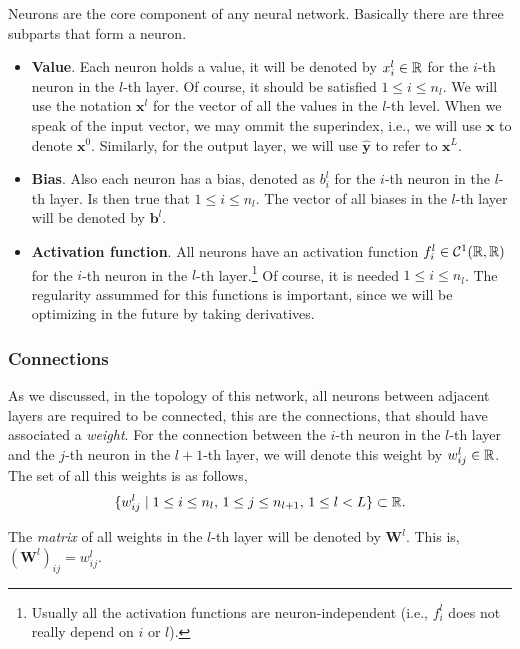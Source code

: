 Neurons are the core component of any neural network. Basically there are three
subparts that form a neuron.
\begin{itemize}
  \item \textbf{Value}. Each neuron holds a value, it will be denoted by
  \(x_i^l \in \mathbb{R}\) for the \(i\)-th neuron in the \(l\)-th layer. Of course, it
  should be satisfied \(1 \leq i \leq n_l\). We will use the notation
  \(\mathbf{x}^l\) for the vector of all the values in the \(l\)-th level. When
  we speak of the input vector, we may ommit the superindex, i.e., we will use
  \(\mathbf{x}\) to denote \(\mathbf{x}^0\). Similarly, for the output layer,
  we will use \(\mathbf{\hat{y}}\) to refer to \(\mathbf{x}^L\).
  \item \textbf{Bias}. Also each neuron has a bias, denoted as \(b_i^l\) for
  the \(i\)-th neuron in the \(l\)-th layer. Is then true that
  \(1 \leq i \leq n_l\). The vector of all biases in the \(l\)-th layer will be
  denoted by \(\mathbf{b}^l\).
  \item \textbf{Activation function}. All neurons have an activation function
  \(f_i ^ l \in \mathcal{C} ^ 1 (\mathbb{R}, \mathbb{R})\) for the \(i\)-th neuron in the
  \(l\)-th layer.\footnote{Usually all the activation functions are
    neuron-independent (i.e., \(f_i^l\) does not really depend on \(i\) or
    \(l\)).} Of course, it is needed \(1 \leq i \leq n_l\). The regularity
  assummed for this functions is important, since we will be optimizing in the
  future by taking derivatives.
\end{itemize}

\subsubsection{Connections}

As we discussed, in the topology of this network, all neurons between adjacent
layers are required to be connected, this are the connections, that should have
associated a \emph{weight}. For the connection between the \(i\)-th neuron in
the \(l\)-th layer and the \(j\)-th neuron in the \(l + 1\)-th layer, we will
denote this weight by \(w_{ij}^l \in \mathbb{R}\). The set of all this weights is as
follows,
\begin{equation}
  \{w_{ij}^l \mid 1 \leq i \leq n_{l}, \, 1 \leq j \leq n_{l+1}, \,
  1 \leq l < L \} \subset \mathbb{R}.
\end{equation}

The \emph{matrix} of all weights in the \(l\)-th layer will be denoted by
\(\mathbf{W}^l\). This is, \((\mathbf{W}^l)_{ij} = w_{ij}^ l\).

